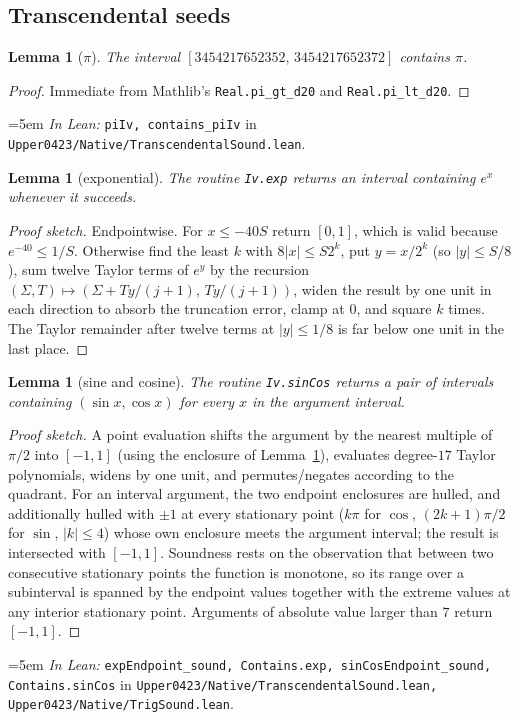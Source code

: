 \documentclass[11pt,a4paper]{article}
\newtheorem{lemma}[theorem]{Lemma}
\theoremstyle{definition}
\newcommand{\Lean}[1]{\texttt{#1}}
\newcommand{\file}[1]{\texttt{#1}}
\newcommand{\formal}[2]{%
  \par\smallskip
  \begingroup\small\raggedright\emergencystretch=5em
  \noindent\textit{In Lean:} \Lean{#1} in \file{#2}.\par
  \endgroup\smallskip}
\begin{document}
\subsection{Transcendental seeds}

\begin{lemma}[$\pi$]
  \label{lem:pi}
  The interval $[3454217652352,\,3454217652372]$ contains $\pi$.
\end{lemma}
\begin{proof}
  Immediate from Mathlib's \Lean{Real.pi\_gt\_d20} and \Lean{Real.pi\_lt\_d20}.
\end{proof}
\formal{piIv, contains\_piIv}{Upper0423/Native/TranscendentalSound.lean}

\begin{lemma}[exponential]
  \label{lem:exp}
  The routine \Lean{Iv.exp} returns an interval containing $e^x$ whenever it
  succeeds.
\end{lemma}
\begin{proof}[Proof sketch]
  Endpointwise. For $x\le-40S$ return $[0,1]$, which is valid because
  $e^{-40}\le1/S$. Otherwise find the least $k$ with $8|x|\le S2^k$, put
  $y=x/2^k$ (so $|y|\le S/8$), sum twelve Taylor terms of $e^y$ by the recursion
  $(\Sigma,T)\mapsto(\Sigma+Ty/(j{+}1),\,Ty/(j{+}1))$, widen the result by one
  unit in each direction to absorb the truncation error, clamp at $0$, and square
  $k$ times. The Taylor remainder after twelve terms at $|y|\le1/8$ is far below
  one unit in the last place.
\end{proof}

\begin{lemma}[sine and cosine]
  \label{lem:sincos}
  The routine \Lean{Iv.sinCos} returns a pair of intervals containing
  $(\sin x,\cos x)$ for every $x$ in the argument interval.
\end{lemma}
\begin{proof}[Proof sketch]
  A point evaluation shifts the argument by the nearest multiple of $\pi/2$ into
  $[-1,1]$ (using the enclosure of Lemma~\ref{lem:pi}), evaluates
  degree-$17$ Taylor polynomials, widens by one unit, and permutes/negates
  according to the quadrant. For an interval argument, the two endpoint
  enclosures are hulled, and additionally hulled with $\pm1$ at every stationary
  point ($k\pi$ for $\cos$, $(2k{+}1)\pi/2$ for $\sin$, $|k|\le4$) whose own
  enclosure meets the argument interval; the result is intersected with
  $[-1,1]$. Soundness rests on the observation that between two consecutive
  stationary points the function is monotone, so its range over a subinterval is
  spanned by the endpoint values together with the extreme values at any
  interior stationary point. Arguments of absolute value larger than $7$ return
  $[-1,1]$.
\end{proof}
\formal{expEndpoint\_sound, Contains.exp, sinCosEndpoint\_sound, Contains.sinCos}{Upper0423/Native/TranscendentalSound.lean, Upper0423/Native/TrigSound.lean}
\end{document}
